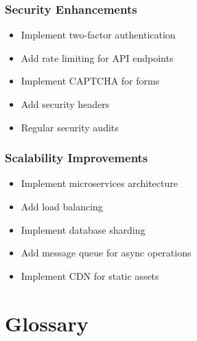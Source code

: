 \documentclass{scrreprt}
\begin{document}
\subsection{Security Enhancements}
\begin{itemize}
\item Implement two-factor authentication
\item Add rate limiting for API endpoints
\item Implement CAPTCHA for forms
\item Add security headers
\item Regular security audits
\end{itemize}

\subsection{Scalability Improvements}
\begin{itemize}
\item Implement microservices architecture
\item Add load balancing
\item Implement database sharding
\item Add message queue for async operations
\item Implement CDN for static assets
\end{itemize}

\chapter{Glossary}
\end{document}
